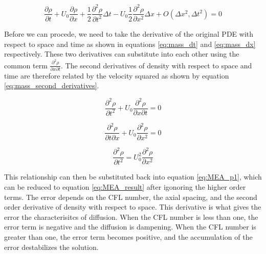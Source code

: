 \documentclass{mc2015}
\begin{document}
    \begin{equation}
    	\label{eq:MEA_p1}
    	 \frac{\partial \rho}{\partial t}  +  U_{0} \frac{\partial \rho}{\partial x} + 
    	 \frac{1}{2} \frac{\partial^2 \rho}{\partial t^2} \Delta t -
    	   U_{0}  \frac{1}{2} \frac{\partial^2 \rho}{\partial x^2} \Delta x  
    	   + O(\Delta x^{2},\Delta t^{2}) = 0 
    \end{equation} \linebreak
    
    Before we can procede, we need to take the derivative of the original PDE with respect
    to space and time as shown in equations \ref{eq:mass_dt} and  \ref{eq:mass_dx} 
    respectively. These two derivatives can substitute into each other using the common 
    term $\frac{\partial^2 \rho}{\partial x \partial t}$. The second derivatives of density with 
    respect to space and time are therefore related by the velocity squared as
    shown by equation \ref{eq:mass_second_derivatives}.
    
    \begin{equation}
    \label{eq:mass_dt}
    	 \frac{\partial^2 \rho}{\partial t^2} + U_{0} \frac{\partial^2 \rho}{\partial x \partial t} = 0
    \end{equation}
    
    \begin{equation}
    \label{eq:mass_dx}
    	 \frac{\partial^2 \rho}{\partial t \partial x} + U_{0} \frac{\partial^2 \rho}{\partial x^2} = 0
    \end{equation}
    
    \begin{equation}
    \label{eq:mass_second_derivatives}
    	 \frac{\partial^2 \rho}{\partial t^2} =  U_{0}^2 \frac{\partial^2 \rho}{\partial x^2}
    \end{equation} \linebreak
    
    This relationship can then be substituted back into equation \ref{eq:MEA_p1}, 
    which can be reduced to equation \ref{eq:MEA_result} after igonoring the higher
    order terms. The error depends on the CFL number, the axial spacing, and the
    second order derivative of density with respect to space. This derivative is
    what gives the error the characterisitcs of diffusion. When the CFL number is
    less than one, the error term is negative and the diffusion is dampening. When
    the CFL number is greater than one, the error term becomes positive, and the
    accumulation of the error destabilizes the solution. 
    
\end{document}

